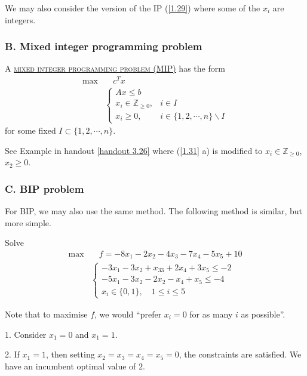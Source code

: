 We may also consider the version of the IP (\ref{1.29}) where some of the  $x_i$ are integers. 

\subsubsection{B. Mixed integer programming problem}
A \uline{\textcolor{MarkerColour}{\textsc{mixed integer programming problem (MIP)}}} has the form
\begin{align*}
    \max & \quad c^T x\\
    &\left\lbrace\begin{array}{ll}
         Ax\leqslant b  & \\
         x_i\in\mathbb{Z}_{\geqslant 0}, & i\in I \\
         x_i\geqslant 0, & i\in\{1, 2, \cdots, n\}\backslash I
    \end{array} \right.
\end{align*}
for some fixed $I\subset \{1, 2, \cdots, n\}$.

See Example in handout \ref{handout 3.26} where (\ref{1.31} a) is modified to $x_i\in\mathbb{Z}_{\geqslant 0}$, $x_2\geqslant 0$.

\subsubsection{C. BIP problem}
For BIP, we may also use the same method. The following method is similar, but more simple.
\begin{example}
    Solve
    \begin{align*}
        \max & \quad f = -8x_1 - 2x_2 -4x_3 - 7x_4 - 5x_5 + 10 \\
        & \left\lbrace\begin{array}{l}
             -3x_1 - 3x_2 + x_33 + 2x_4 +3x_5\leqslant -2\\
             -5x_1 - 3x_2 - 2x_2 -x_4 + x_5\leqslant -4\\
             x_i\in\{0, 1\}, \quad 1\leqslant i \leqslant 5
        \end{array} \right.
    \end{align*}
\end{example}

Note that to maximise $f$, we would ``prefer $x_i = 0$ for as many $i$ as possible''.

1. Consider $x_1 = 0$ and $x_1 = 1$. 

2. If $x_1 = 1$, then setting $x_2 = x_3 = x_4 = x_5 = 0$, the constraints are satisfied. We have an incumbent optimal value of $2$.

